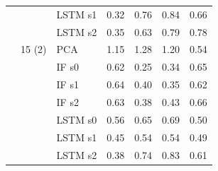 \begin{scriptsize}
\begin{longtable}{lllrrrr}
 &  & LSTM s1 & 0.32 & 0.76 & 0.84 & 0.66 \\
 &  & LSTM s2 & 0.35 & 0.63 & 0.79 & 0.78 \\
 & 15 (2) & PCA & 1.15 & 1.28 & 1.20 & 0.54 \\
 &  & IF s0 & 0.62 & 0.25 & 0.34 & 0.65 \\
 &  & IF s1 & 0.64 & 0.40 & 0.35 & 0.62 \\
 &  & IF s2 & 0.63 & 0.38 & 0.43 & 0.66 \\
 &  & LSTM s0 & 0.56 & 0.65 & 0.69 & 0.50 \\
 &  & LSTM s1 & 0.45 & 0.54 & 0.54 & 0.49 \\
 &  & LSTM s2 & 0.38 & 0.74 & 0.83 & 0.61 \\
\end{longtable}
\end{scriptsize}
